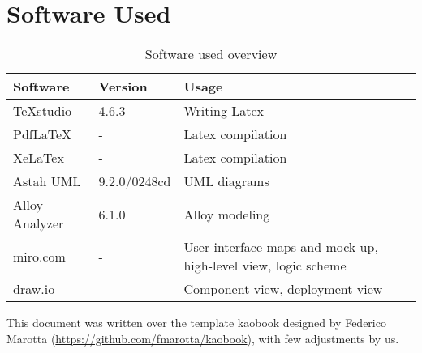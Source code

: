 \chapter{Software Used}
\begin{center}
	\begin{table}[H]
		\begin{tabular}{ | m{3cm} | m{3cm} | m{3cm} | } 
			\hline
			\textbf {Software} & \textbf{Version} & \textbf{Usage} \\
			\hline
			TeXstudio & 4.6.3 & Writing Latex \\
			\hline
			PdfLaTeX & - & Latex compilation \\
			\hline
			XeLaTex & - & Latex compilation \\
			\hline
			Astah UML & 9.2.0/0248cd & UML diagrams \\
			\hline
			Alloy Analyzer & 6.1.0 & Alloy modeling \\
			\hline
			miro.com & - & User interface maps and mock-up, high-level view, logic scheme \\
			\hline
			draw.io & - & Component view, deployment view \\
			\hline
		\end{tabular}
		\caption{Software used overview}
	\end{table}
\end{center}

This document was written over the template kaobook designed by Federico Marotta (\url{https://github.com/fmarotta/kaobook}), with few adjustments by us.